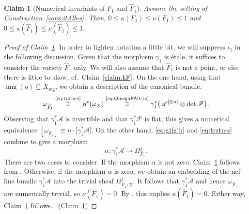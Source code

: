 \documentclass[JEP,XML,SOM,Unicode,published]{cedram}
\let\scr\mathscr
\theoremstyle{plain}
\newtheorem{claim}[thm]{Claim}
\theoremstyle{definition}
\numberwithin{equation}{thm}
\numberwithin{enumi}{thm}
\DeclareMathOperator{\img}{img}
\newcommand{\reg}{\mathrm{reg}}
\newcommand{\sA}{\scr{A}}
\newcommand{\sF}{\scr{F}}
\let\what\widehat
\begin{document}
\begin{claim}[Numerical invariants of $F_1$ and $\what{F}_1$]\label{claim:6-23a-s}
Assume the setting of Construction~\ref{cons:itAlb-s}. Then,
$0 \leq \kappa(F_1) \leq \nu(F_1) \leq 1$ and $0 \leq \kappa(\what{F}_1) \leq \nu(\what{F}_1) \leq 1$.
\end{claim}
\begin{proof}[Proof of Claim~\ref{claim:6-23a-s}]
In order to lighten notation a little bit, we will suppress $\iota_1$ in the
following discussion. Given that the morphism $\gamma_1$ is étale, it suffices to
consider the variety $\what{F}_1$ only. We will also assume that $\what{F}_1$
is not a point, or else there is little to show, cf.~Claim~\ref{claim:kF}. On
the one hand, using that $\img(\eta) \subsetneq X_{\reg}$, we obtain a description of the
canonical bundle,
\[
\omega_{\what{F}_1} \overset{\text{\eqref{eq:trztu-s}}}{\cong} \eta^*(\omega_X)
\overset{\text{\eqref{eq:OmegaFA0-1a}}}{\cong} \gamma_1^* \bigl(\sA^{[\otimes n]} \otimes \det
\sF\bigr).
\]
Observing that $\gamma_1^* \sA$ is invertible and that $\gamma_1^* \sF$ is flat, this gives
a numerical equivalence $[\omega_{\what{F}_1}] \equiv n\cdot \bigl[\gamma_1^* \sA\bigr]$. On
the other hand, \eqref{eq:gjfgjh} and \eqref{eq:trztu-s} combine to give a
morphism
\[
\alpha : \gamma_1^* \sA \to \Omega^1_{\what{F}_1}.
\]
There are two cases to consider. If the morphism $\alpha$ is not zero,
Claim~\ref{claim:6-23a-s} follows from \cite[Lem.\,3.1]{MR3030068}. Otherwise,
if the morphism $\alpha$ is zero, we obtain an embedding of the nef line bundle
$\gamma_1^* \sA$ into the trivial sheaf $\Omega^1_{\what{F}_1/X}$. It follows that
$\gamma_1^* \sA$ and hence $\omega_{\what{F}_1}$ are numerically trivial, so
$\nu(\what{F}_1) = 0$. By \cite[Th.\,8.2]{Kawamata85}, this implies
$\kappa(\what{F}_1) = 0$. Either way, Claim~\ref{claim:6-23a-s} follows.
\qedhere~\mbox{(Claim~\ref{claim:6-23a-s})}
\end{proof}
\end{document}
